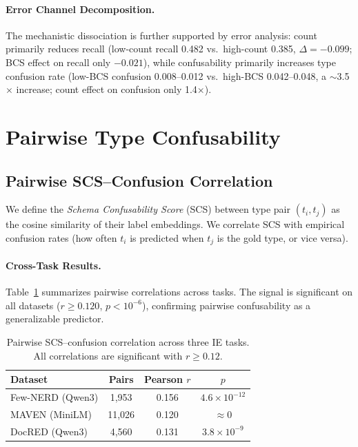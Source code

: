 \documentclass[11pt,a4paper]{article}
\begin{document}
\paragraph{Error Channel Decomposition.}
The mechanistic dissociation is further supported by error analysis: count primarily reduces recall (low-count recall 0.482 vs.\ high-count 0.385, $\Delta = -0.099$; BCS effect on recall only $-0.021$), while confusability primarily increases type confusion rate (low-BCS confusion 0.008--0.012 vs.\ high-BCS 0.042--0.048, a $\sim$3.5$\times$ increase; count effect on confusion only 1.4$\times$).


\section{Pairwise Type Confusability}
\label{sec:confusability}

\subsection{Pairwise SCS--Confusion Correlation}

We define the \emph{Schema Confusability Score} (SCS) between type pair $(t_i, t_j)$ as the cosine similarity of their label embeddings.
We correlate SCS with empirical confusion rates (how often $t_i$ is predicted when $t_j$ is the gold type, or vice versa).

\paragraph{Cross-Task Results.}
Table~\ref{tab:pairwise} summarizes pairwise correlations across tasks. The signal is significant on all datasets ($r \geq 0.120$, $p < 10^{-6}$), confirming pairwise confusability as a generalizable predictor.

\begin{table}[t]
\centering
\small
\begin{tabular}{lccc}
\toprule
Dataset & Pairs & Pearson $r$ & $p$ \\
\midrule
Few-NERD (Qwen3)  & 1,953  & 0.156 & $4.6 \times 10^{-12}$ \\
MAVEN (MiniLM)    & 11,026 & 0.120 & $\approx 0$ \\
DocRED (Qwen3)    & 4,560  & 0.131 & $3.8 \times 10^{-9}$ \\
\bottomrule
\end{tabular}
\caption{Pairwise SCS--confusion correlation across three IE tasks. All correlations are significant with $r \geq 0.12$.}
\label{tab:pairwise}
\end{table}
\end{document}

